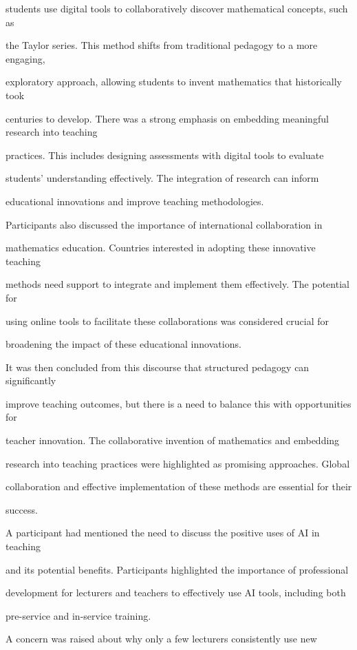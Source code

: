 \documentclass[11pt]{article}
\begin{document}
students use digital tools to collaboratively discover mathematical concepts, such as

the Taylor series. This method shifts from traditional pedagogy to a more engaging,

exploratory approach, allowing students to invent mathematics that historically took

centuries to develop. There was a strong emphasis on embedding meaningful research into teaching

practices. This includes designing assessments with digital tools to evaluate

students' understanding effectively. The integration of research can inform

educational innovations and improve teaching methodologies.

Participants also discussed the importance of international collaboration in

mathematics education. Countries interested in adopting these innovative teaching

methods need support to integrate and implement them effectively. The potential for

using online tools to facilitate these collaborations was considered crucial for

broadening the impact of these educational innovations.

It was then concluded from this discourse that structured pedagogy can significantly

improve teaching outcomes, but there is a need to balance this with opportunities for

teacher innovation. The collaborative invention of mathematics and embedding

research into teaching practices were highlighted as promising approaches. Global

collaboration and effective implementation of these methods are essential for their

success.

A participant had mentioned the need to discuss the positive uses of AI in teaching

and its potential benefits. Participants highlighted the importance of professional

development for lecturers and teachers to effectively use AI tools, including both

pre-service and in-service training.

A concern was raised about why only a few lecturers consistently use new
\end{document}
